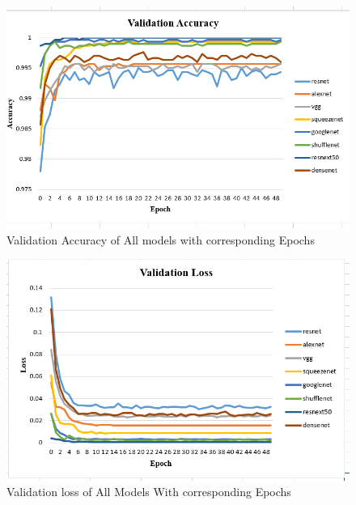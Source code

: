 \documentclass[a4paper,fleqn]{cas-sc}
\begin{document}
\begin{figure}[!ht]
\includegraphics[scale=0.75]{Train validation Accuracy}
\caption{Validation Accuracy of All models with corresponding Epochs}
\label{}
\end{figure}

\begin{figure}[!ht]
\includegraphics[scale=0.75]{validation loss}
\caption{Validation loss of All Models With corresponding Epochs}
\label{}
\end{figure}
\end{document}
